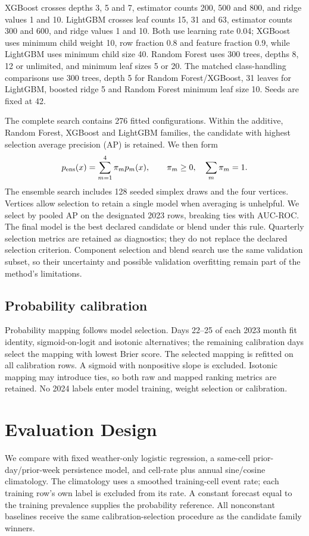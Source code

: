 \documentclass[conference]{IEEEtran}
\begin{document}
XGBoost crosses depths 3, 5 and 7, estimator counts 200, 500 and 800, and ridge values 1 and 10. LightGBM crosses leaf counts 15, 31 and 63, estimator counts 300 and 600, and ridge values 1 and 10. Both use learning rate 0.04; XGBoost uses minimum child weight 10, row fraction 0.8 and feature fraction 0.9, while LightGBM uses minimum child size 40. Random Forest uses 300 trees, depths 8, 12 or unlimited, and minimum leaf sizes 5 or 20. The matched class-handling comparisons use 300 trees, depth 5 for Random Forest/XGBoost, 31 leaves for LightGBM, boosted ridge 5 and Random Forest minimum leaf size 10. Seeds are fixed at 42.

The complete search contains 276 fitted configurations. Within the additive, Random Forest, XGBoost and LightGBM families, the candidate with highest selection average precision (AP) is retained. We then form
\begin{equation}
 p_{\rm ens}(x)=\sum_{m=1}^{4}\pi_m p_m(x),\qquad
 \pi_m\geq0,\quad\sum_m\pi_m=1.
\end{equation}
The ensemble search includes 128 seeded simplex draws and the four vertices. Vertices allow selection to retain a single model when averaging is unhelpful. We select by pooled AP on the designated 2023 rows, breaking ties with AUC-ROC. The final model is the best declared candidate or blend under this rule. Quarterly selection metrics are retained as diagnostics; they do not replace the declared selection criterion. Component selection and blend search use the same validation subset, so their uncertainty and possible validation overfitting remain part of the method's limitations.

\subsection{Probability calibration}
Probability mapping follows model selection. Days 22--25 of each 2023 month fit identity, sigmoid-on-logit and isotonic alternatives; the remaining calibration days select the mapping with lowest Brier score. The selected mapping is refitted on all calibration rows. A sigmoid with nonpositive slope is excluded. Isotonic mapping may introduce ties, so both raw and mapped ranking metrics are retained. No 2024 labels enter model training, weight selection or calibration.

\section{Evaluation Design}
We compare with fixed weather-only logistic regression, a same-cell prior-day/prior-week persistence model, and cell-rate plus annual sine/cosine climatology. The climatology uses a smoothed training-cell event rate; each training row's own label is excluded from its rate. A constant forecast equal to the training prevalence supplies the probability reference. All nonconstant baselines receive the same calibration-selection procedure as the candidate family winners.
\end{document}
